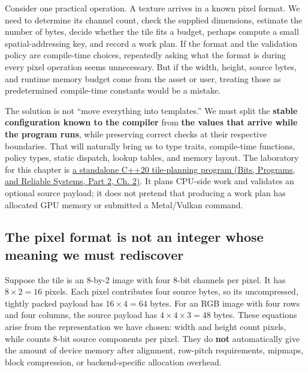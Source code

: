 Consider one practical operation. A texture arrives in a known pixel format. We need to determine its channel count, check the supplied dimensions, estimate the number of bytes, decide whether the tile fits a budget, perhaps compute a small spatial-addressing key, and record a work plan. If the format and the validation policy are compile-time choices, repeatedly asking what the format is during every pixel operation seems unnecessary. But if the width, height, source bytes, and runtime memory budget come from the asset or user, treating those as predetermined compile-time constants would be a mistake.

The solution is not ``move everything into templates.'' We must split the \textbf{stable configuration known to the compiler} from \textbf{the values that arrive while the program runs}, while preserving correct checks at their respective boundaries. That will naturally bring us to type traits, compile-time functions, policy types, static dispatch, lookup tables, and memory layout. The laboratory for this chapter is \href{../01-Bits-Programs-and-Reliable-Systems-P02/main.pdf\#nameddest=source-file-f5eb017280bb6b2ae6b1475d}{a standalone C++20 tile-planning program (Bits, Programs, and Reliable Systems, Part 2, Ch. 2)}. It plans CPU-side work and validates an optional source payload; it does not pretend that producing a work plan has allocated GPU memory or submitted a Metal/Vulkan command.

\subsection{The pixel format is not an integer whose meaning we must rediscover}\label{05-engine-i-ch005-the-pixel-format-is-not-an-integer-whose-meaning-we-must-rediscover}

\hypertarget{05-engine-i-ch005-the-pixel-format-is-not-an-integer-whose-meaning-we-must-rediscover}{}

Suppose the tile is an 8-by-2 image with four 8-bit channels per pixel. It has \(8\times 2=16\) pixels. Each pixel contributes four source bytes, so its uncompressed, tightly packed payload has \(16\times4=64\) bytes. For an RGB image with four rows and four columns, the source payload has \(4\times4\times3=48\) bytes. These equations arise from the representation we have chosen: width and height count pixels, while  counts 8-bit source components per pixel. They do \textbf{not} automatically give the amount of device memory after alignment, row-pitch requirements, mipmaps, block compression, or backend-specific allocation overhead.

